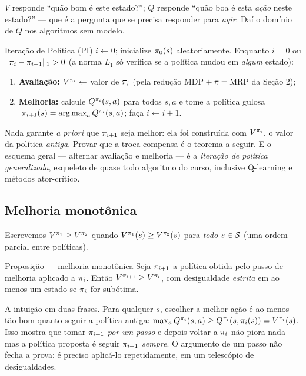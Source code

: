 \documentclass[11pt, a4paper]{article}
\begin{document}
$V$ responde ``quão bom é este estado?''; $Q$ responde ``quão boa é esta \emph{ação}
neste estado?'' --- que é a pergunta que se precisa responder para \emph{agir}. Daí o
domínio de $Q$ nos algoritmos sem modelo.

\begin{algbox}{Iteração de Política (PI)}
$i \leftarrow 0$; inicialize $\pi_0(s)$ aleatoriamente. Enquanto $i = 0$ ou
$\lVert\pi_i - \pi_{i-1}\rVert_1 > 0$ (a norma $L_1$ só verifica se a política mudou em
\emph{algum} estado):
\begin{enumerate}
  \item \textbf{Avaliação:} $V^{\pi_i} \leftarrow$ valor de $\pi_i$
        (pela redução MDP${}+\pi{}=\,$MRP da Seção 2);
  \item \textbf{Melhoria:} calcule $Q^{\pi_i}(s,a)$ para todos $s, a$ e tome a política
        gulosa \(\;\pi_{i+1}(s) = \operatorname*{arg\,max}_a Q^{\pi_i}(s,a)\); faça $i \leftarrow i+1$.
\end{enumerate}
\end{algbox}

\begin{ideiabox}
Nada garante \emph{a priori} que $\pi_{i+1}$ seja melhor: ela foi construída com
$V^{\pi_i}$, o valor da política \emph{antiga}. Provar que a troca compensa é o teorema
a seguir. E o esquema geral --- alternar avaliação e melhoria --- é a \emph{iteração de
política generalizada}, esqueleto de quase todo algoritmo do curso, inclusive Q-learning
e métodos ator-crítico.
\end{ideiabox}

\subsection{Melhoria monotônica}

Escrevemos $V^{\pi_1} \ge V^{\pi_2}$ quando $V^{\pi_1}(s) \ge V^{\pi_2}(s)$ para
\emph{todo} $s \in \mathcal{S}$ (uma ordem parcial entre políticas).

\begin{teobox}{Proposição --- melhoria monotônica}
Seja $\pi_{i+1}$ a política obtida pelo passo de melhoria aplicado a $\pi_i$. Então
$V^{\pi_{i+1}} \ge V^{\pi_i}$, com desigualdade \emph{estrita} em ao menos um estado
se $\pi_i$ for subótima.
\end{teobox}

A intuição em duas frases. Para qualquer $s$, escolher a melhor ação é ao menos tão bom
quanto seguir a política antiga:
$\max_a Q^{\pi_i}(s,a) \ge Q^{\pi_i}(s, \pi_i(s)) = V^{\pi_i}(s)$. Isso mostra que
tomar $\pi_{i+1}$ \emph{por um passo} e depois voltar a $\pi_i$ não piora nada --- mas
a política proposta é seguir $\pi_{i+1}$ \emph{sempre}. O argumento de um passo não
fecha a prova: é preciso aplicá-lo repetidamente, em um telescópio de desigualdades.
\end{document}
